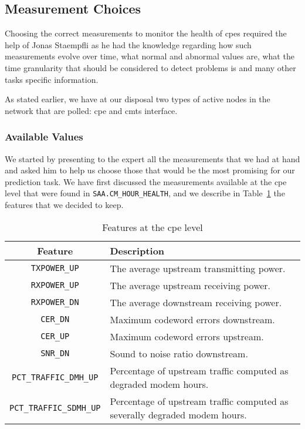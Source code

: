 \subsection{Measurement Choices}
\label{subsec:mes_choices}
Choosing the correct measurements to monitor the health of \acrshort{cpe}s required the help of Jonas Staempfli as he had the knowledge regarding how such measurements evolve over time, what normal and abnormal values are, what the time granularity that should be considered to detect problems is and many other tasks specific information. 

As stated earlier, we have at our disposal two types of active nodes in the network that are polled: \acrshort{cpe} and \acrshort{cmts} interface. 

\subsubsection{Available Values}
We started by presenting to the expert all the measurements that we had at hand and asked him to help us choose those that would be the most promising for our prediction task. We have first discussed the measurements available at the \acrshort{cpe} level that were found in \texttt{SAA.CM\_HOUR\_HEALTH}, and we describe in Table~\ref{CPEMes} the features that we decided to keep.

\begin{table}[h]
\begin{center}
\begin{tabular}{c l}
\hline
\textbf{Feature} & \textbf{Description}\\ 
\hline\hline
\texttt{TXPOWER\_UP} & The average upstream transmitting power.\\
\hline
\texttt{RXPOWER\_UP} & The average upstream receiving power.\\
\hline
\texttt{RXPOWER\_DN} & The average downstream receiving power.\\
\hline
\texttt{CER\_DN} & Maximum codeword errors downstream.\\
\hline
\texttt{CER\_UP} & Maximum codeword errors upstream.\\
\hline
\texttt{SNR\_DN} & Sound to noise ratio downstream.\\
\hline
\texttt{PCT\_TRAFFIC\_DMH\_UP} & Percentage of upstream traffic computed as degraded modem hours.\\
\hline
\texttt{PCT\_TRAFFIC\_SDMH\_UP} & Percentage of upstream traffic computed as severally degraded modem hours.
\end{tabular}
\end{center}
\caption{\label{CPEMes}Features at the \acrshort{cpe} level}
\end{table}

